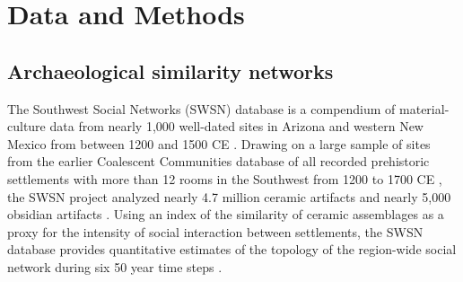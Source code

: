 \documentclass[11pt]{wlscirep}
\begin{document}






\section*{Data and Methods}

\subsection*{Archaeological similarity networks}

The Southwest Social Networks (SWSN) database is a compendium of material-culture data from nearly 1,000 well-dated sites in Arizona and western New Mexico from between 1200 and 1500 CE \cite{Mills2012,Mills2013a,Peeples2013,Borck2015,Hill2015,Mills2015a}. Drawing on a large sample of sites from the earlier Coalescent Communities database of all recorded prehistoric settlements with more than 12 rooms in the Southwest from 1200 to 1700 CE \cite{Hill2004}, the SWSN project analyzed nearly 4.7 million ceramic artifacts and nearly 5,000 obsidian artifacts \cite{Mills2015a}. Using an index of the similarity of ceramic assemblages as a proxy for the intensity of social interaction between settlements, the SWSN database provides quantitative estimates of the topology of the region-wide social network during six 50 year time steps \cite{Mills2013a}.
\end{document}
